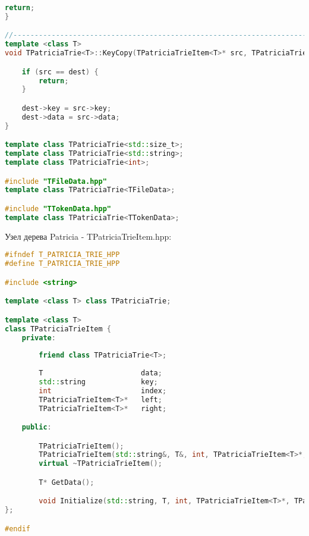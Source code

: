 \begin{lstlisting}[language=C++]
    return;
}

//----------------------------------------------------------------------------
template <class T>
void TPatriciaTrie<T>::KeyCopy(TPatriciaTrieItem<T>* src, TPatriciaTrieItem<T>* dest) {

    if (src == dest) {
        return;
    }

    dest->key = src->key;
    dest->data = src->data;
}

template class TPatriciaTrie<std::size_t>;
template class TPatriciaTrie<std::string>;
template class TPatriciaTrie<int>;

#include "TFileData.hpp"
template class TPatriciaTrie<TFileData>;

#include "TTokenData.hpp"
template class TPatriciaTrie<TTokenData>;


\end{lstlisting}

Узел дерева Patricia - TPatriciaTrieItem.hpp:
\begin{lstlisting}[language=C++]
#ifndef T_PATRICIA_TRIE_HPP
#define T_PATRICIA_TRIE_HPP

#include <string>

template <class T> class TPatriciaTrie;

template <class T>
class TPatriciaTrieItem {
    private:
        
        friend class TPatriciaTrie<T>;
        
        T                       data;
        std::string             key;
        int                     index;
        TPatriciaTrieItem<T>*   left;
        TPatriciaTrieItem<T>*   right;

    public:

        TPatriciaTrieItem();
        TPatriciaTrieItem(std::string&, T&, int, TPatriciaTrieItem<T>*, TPatriciaTrieItem<T>*);
        virtual ~TPatriciaTrieItem();

        T* GetData();

        void Initialize(std::string, T, int, TPatriciaTrieItem<T>*, TPatriciaTrieItem<T>*);
};

#endif
\end{lstlisting}

